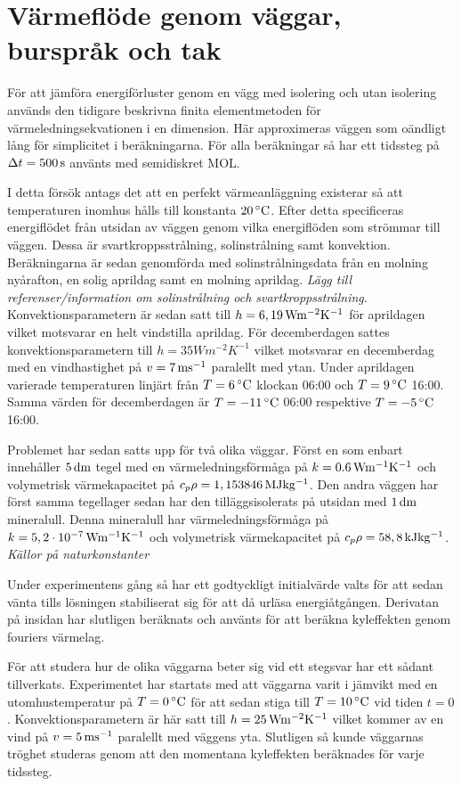 \section{Värmeflöde genom väggar, burspråk och tak}

För att jämföra energiförluster genom en vägg med isolering och utan isolering används
den tidigare beskrivna finita elementmetoden för värmeledningsekvationen i en dimension. Här approximeras
väggen som oändligt lång för simplicitet i beräkningarna. För alla beräkningar så har ett tidssteg
på $\Delta t = \unit[500]{s}$ använts med semidiskret MOL.

I detta försök antags det att en perfekt värmeanläggning
existerar så att temperaturen inomhus hålls till konstanta $\unit[20]{^\circ C}$. Efter detta specificeras energiflödet
från utsidan av väggen genom vilka energiflöden som strömmar till väggen. Dessa är svartkroppsstrålning, solinstrålning
samt konvektion. Beräkningarna är sedan genomförda med solinstrålningsdata från en molning nyårafton,
en solig aprildag samt en molning aprildag.\emph{\color{red} Lägg till referenser/information om solinstrålning och svartkroppsstrålning}.
Konvektionsparametern är sedan satt till $h=\unit[6,19]{Wm^{-2}K^{-1}}$ för aprildagen vilket motsvarar en helt vindstilla aprildag.
För decemberdagen sattes konvektionsparametern till $h=\unit{35}{Wm^{-2}K^{-1}}$ vilket motsvarar en decemberdag med en vindhastighet på $v=\unit[7]{ms^{-1}}$ paralellt
med ytan.
Under aprildagen varierade temperaturen linjärt från $T=\unit[6]{^\circ C}$ klockan 06:00 och $T=\unit[9]{^\circ C}$ 16:00.
Samma värden för decemberdagen är $T = \unit[-11]{^\circ C}$ 06:00 respektive $T=\unit[-5]{^\circ C}$ 16:00.

Problemet har sedan satts upp för två olika väggar. Först en som enbart innehåller $\unit[5]{dm}$ tegel med
en värmeledningsförmåga på $k = \unit[0.6]{Wm^{-1}K^{-1}}$ och volymetrisk värmekapacitet på
$c_{p}\rho = \unit[1,153846]{MJ kg^{-1}}$. Den andra väggen har först samma tegellager sedan
har den tilläggsisolerats på utsidan med $\unit[1]{dm}$ mineralull. Denna mineralull har värmeledningsförmåga på
$k = \unit[5,2\cdot 10^{-7}]{Wm^{-1}K^{-1}}$ och volymetrisk värmekapacitet på
$c_{p}\rho = \unit[58,8]{kJ kg^{-1}}$.
\emph{\color{red} Källor på naturkonstanter}

Under experimentens gång så har ett godtyckligt initialvärde valts för att sedan vänta tills
lösningen stabiliserat sig för att då urläsa energiåtgången. Derivatan på insidan har slutligen beräknats
och använts för att beräkna kyleffekten genom fouriers värmelag.

För att studera hur de olika väggarna beter sig vid ett stegsvar har ett sådant tillverkats. Experimentet
har startats med att väggarna varit i jämvikt med en utomhustemperatur på $T = \unit[0]{^\circ C}$ för att
sedan stiga till $T = \unit[10]{^\circ C}$ vid tiden $t=0$. Konvektionsparametern är här satt till
$h = \unit[25]{W m^{-2}K^{-1}}$ vilket kommer av en vind på
$v = \unit[5]{ms^{-1}}$ paralellt med väggens yta. Slutligen så kunde väggarnas
tröghet studeras genom att den momentana kyleffekten beräknades för varje tidssteg. 
